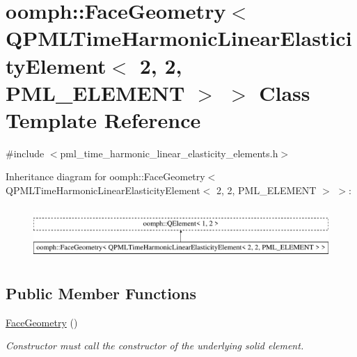 \hypertarget{classoomph_1_1FaceGeometry_3_01QPMLTimeHarmonicLinearElasticityElement_3_012_00_012_00_01PML__ELEMENT_01_4_01_4}{}\section{oomph\+:\+:Face\+Geometry$<$ Q\+P\+M\+L\+Time\+Harmonic\+Linear\+Elasticity\+Element$<$ 2, 2, P\+M\+L\+\_\+\+E\+L\+E\+M\+E\+NT $>$ $>$ Class Template Reference}
\label{classoomph_1_1FaceGeometry_3_01QPMLTimeHarmonicLinearElasticityElement_3_012_00_012_00_01PML__ELEMENT_01_4_01_4}


{\ttfamily \#include $<$pml\+\_\+time\+\_\+harmonic\+\_\+linear\+\_\+elasticity\+\_\+elements.\+h$>$}

Inheritance diagram for oomph\+:\+:Face\+Geometry$<$ Q\+P\+M\+L\+Time\+Harmonic\+Linear\+Elasticity\+Element$<$ 2, 2, P\+M\+L\+\_\+\+E\+L\+E\+M\+E\+NT $>$ $>$\+:\begin{figure}[H]
\begin{center}
\leavevmode
\includegraphics[height=1.989343cm]{classoomph_1_1FaceGeometry_3_01QPMLTimeHarmonicLinearElasticityElement_3_012_00_012_00_01PML__ELEMENT_01_4_01_4}
\end{center}
\end{figure}
\subsection*{Public Member Functions}
\begin{DoxyCompactItemize}
\item 
\hyperlink{classoomph_1_1FaceGeometry_3_01QPMLTimeHarmonicLinearElasticityElement_3_012_00_012_00_01PML__ELEMENT_01_4_01_4_afa8ada06e11529717cf4e268813acf8f}{Face\+Geometry} ()
\begin{DoxyCompactList}\small\item\em Constructor must call the constructor of the underlying solid element. \end{DoxyCompactList}\end{DoxyCompactItemize}


